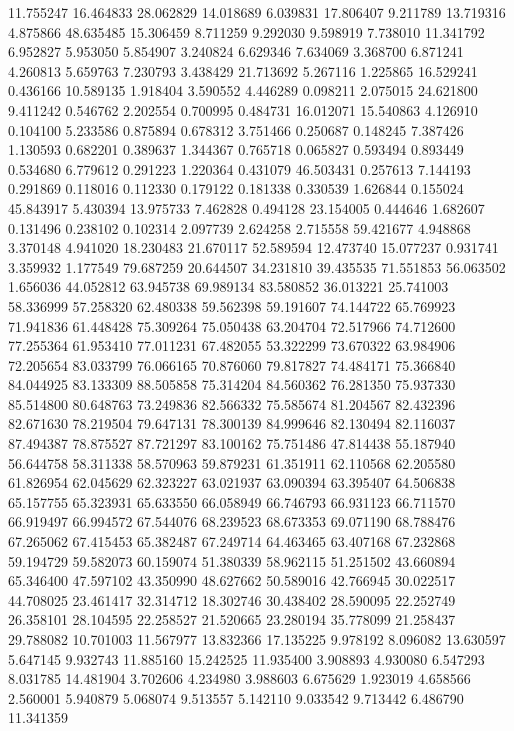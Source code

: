 11.755247
16.464833
28.062829
14.018689
6.039831
17.806407
9.211789
13.719316
4.875866
48.635485
15.306459
8.711259
9.292030
9.598919
7.738010
11.341792
6.952827
5.953050
5.854907
3.240824
6.629346
7.634069
3.368700
6.871241
4.260813
5.659763
7.230793
3.438429
21.713692
5.267116
1.225865
16.529241
0.436166
10.589135
1.918404
3.590552
4.446289
0.098211
2.075015
24.621800
9.411242
0.546762
2.202554
0.700995
0.484731
16.012071
15.540863
4.126910
0.104100
5.233586
0.875894
0.678312
3.751466
0.250687
0.148245
7.387426
1.130593
0.682201
0.389637
1.344367
0.765718
0.065827
0.593494
0.893449
0.534680
6.779612
0.291223
1.220364
0.431079
46.503431
0.257613
7.144193
0.291869
0.118016
0.112330
0.179122
0.181338
0.330539
1.626844
0.155024
45.843917
5.430394
13.975733
7.462828
0.494128
23.154005
0.444646
1.682607
0.131496
0.238102
0.102314
2.097739
2.624258
2.715558
59.421677
4.948868
3.370148
4.941020
18.230483
21.670117
52.589594
12.473740
15.077237
0.931741
3.359932
1.177549
79.687259
20.644507
34.231810
39.435535
71.551853
56.063502
1.656036
44.052812
63.945738
69.989134
83.580852
36.013221
25.741003
58.336999
57.258320
62.480338
59.562398
59.191607
74.144722
65.769923
71.941836
61.448428
75.309264
75.050438
63.204704
72.517966
74.712600
77.255364
61.953410
77.011231
67.482055
53.322299
73.670322
63.984906
72.205654
83.033799
76.066165
70.876060
79.817827
74.484171
75.366840
84.044925
83.133309
88.505858
75.314204
84.560362
76.281350
75.937330
85.514800
80.648763
73.249836
82.566332
75.585674
81.204567
82.432396
82.671630
78.219504
79.647131
78.300139
84.999646
82.130494
82.116037
87.494387
78.875527
87.721297
83.100162
75.751486
47.814438
55.187940
56.644758
58.311338
58.570963
59.879231
61.351911
62.110568
62.205580
61.826954
62.045629
62.323227
63.021937
63.090394
63.395407
64.506838
65.157755
65.323931
65.633550
66.058949
66.746793
66.931123
66.711570
66.919497
66.994572
67.544076
68.239523
68.673353
69.071190
68.788476
67.265062
67.415453
65.382487
67.249714
64.463465
63.407168
67.232868
59.194729
59.582073
60.159074
51.380339
58.962115
51.251502
43.660894
65.346400
47.597102
43.350990
48.627662
50.589016
42.766945
30.022517
44.708025
23.461417
32.314712
18.302746
30.438402
28.590095
22.252749
26.358101
28.104595
22.258527
21.520665
23.280194
35.778099
21.258437
29.788082
10.701003
11.567977
13.832366
17.135225
9.978192
8.096082
13.630597
5.647145
9.932743
11.885160
15.242525
11.935400
3.908893
4.930080
6.547293
8.031785
14.481904
3.702606
4.234980
3.988603
6.675629
1.923019
4.658566
2.560001
5.940879
5.068074
9.513557
5.142110
9.033542
9.713442
6.486790
11.341359
